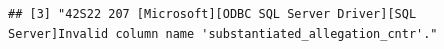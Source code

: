 \documentclass[12pt]{article}\usepackage[]{graphicx}\usepackage[]{color}
\makeatletter
\newenvironment{kframe}{%
 \def\at@end@of@kframe{}%
 \ifinner\ifhmode%
  \def\at@end@of@kframe{\end{minipage}}%
  \begin{minipage}{\columnwidth}%
 \fi\fi%
 \def\FrameCommand##1{\hskip\@totalleftmargin \hskip-\fboxsep
 \colorbox{shadecolor}{##1}\hskip-\fboxsep
     \hskip-\linewidth \hskip-\@totalleftmargin \hskip\columnwidth}%
 \MakeFramed {\advance\hsize-\width
   \@totalleftmargin\z@ \linewidth\hsize
   \@setminipage}}%
 {\par\unskip\endMakeFramed%
 \at@end@of@kframe}
\newenvironment{knitrout}{}{} %
\makeatother
\begin{document}
\begin{knitrout}
\begin{kframe}
\begin{verbatim}
## [3] "42S22 207 [Microsoft][ODBC SQL Server Driver][SQL Server]Invalid column name 'substantiated_allegation_cntr'."                                                                                                                                                                                                                                                                                                                                                                                                                                                                                                                                                                                                                                                                                                                                                                                                                                                                                                                                                                                                                                                                                                                                                                                                                                                                                                                                                                                                                                                                                                                                                                                                                                                                                                                                                                                                                                                                                                                                                                                                                                                                                                                                                                                                                                                                                                                                                                                                                                                                                                                

\end{verbatim}
\end{kframe}
\end{knitrout}
\end{document}
